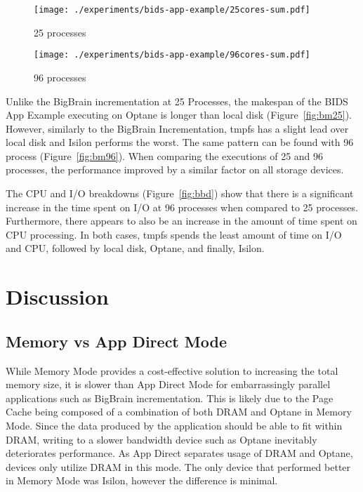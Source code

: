 \documentclass[conference]{IEEEtran}
\newcommand{\bigbrain}{BigBrain\xspace}
\begin{document}
\begin{figure*}
    \begin{subfigure}{\columnwidth}
        \centering
    \texttt{[image: ./experiments/bids-app-example/25cores-sum.pdf]}
    \caption{25 processes}\label{fig:bb25}
\end{subfigure}
    \begin{subfigure}{\columnwidth}
        \centering
    \texttt{[image: ./experiments/bids-app-example/96cores-sum.pdf]}
    \caption{96 processes}\label{fig:bb96}
\end{subfigure}
\caption{I/O and CPU breakdown of BIDS App Example 25 and 96 processes on all storage devices. 3 repetitions were performed}\label{fig:bbd}
\end{figure*}
Unlike the BigBrain incrementation at 25 Processes, the makespan of the BIDS App Example
executing on Optane is longer than local disk (Figure~\ref{fig:bm25}). However, similarly
to the BigBrain Incrementation, tmpfs has a slight lead over local disk and Isilon performs the
worst. The same pattern can be found with 96 process (Figure~\ref{fig:bm96}). When comparing
the executions of 25 and 96 processes, the performance improved by a similar factor on all
storage devices.

The CPU and I/O breakdowns (Figure~\ref{fig:bbd}) show that there is a significant increase
in the time spent on I/O at 96 processes when compared to 25 processes. Furthermore, there appears
to also be an increase in the amount of time spent on CPU processing. In both cases,
tmpfs spends the least amount of time on I/O and CPU, followed by local disk, Optane, and finally,
Isilon.
\section{Discussion}
\subsection{Memory vs App Direct Mode}

While Memory Mode provides a cost-effective solution to increasing the total memory
size, it is slower than App Direct Mode for embarrassingly parallel applications such
as \bigbrain incrementation. This is likely due to the Page Cache being composed of a
combination of both DRAM and Optane in Memory Mode. Since the data produced by the application should be
able to fit within DRAM, writing to a slower bandwidth device such as Optane inevitably
deteriorates performance. As App Direct separates usage of DRAM and Optane, devices only utilize DRAM in this mode.
The only device that performed better in Memory Mode was 
Isilon, however the difference is minimal.
\end{document}
